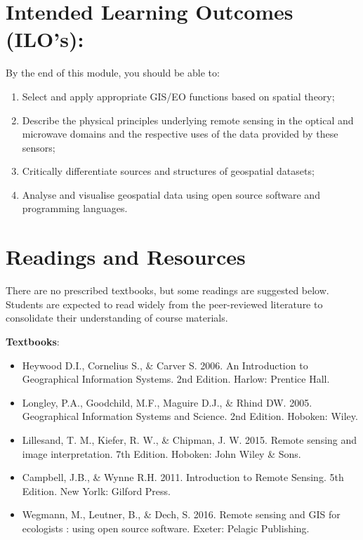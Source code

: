 \documentclass[
]{book}
\providecommand{\tightlist}{%
  \setlength{\itemsep}{0pt}\setlength{\parskip}{0pt}}
\begin{document}
\hypertarget{intended-learning-outcomes-ilos}{%
\section{Intended Learning Outcomes (ILO's):}\label{intended-learning-outcomes-ilos}}

By the end of this module, you should be able to:

\begin{enumerate}
\def\labelenumi{\arabic{enumi}.}
\tightlist
\item
  Select and apply appropriate GIS/EO functions based on spatial theory;
\item
  Describe the physical principles underlying remote sensing in the optical and microwave domains and the respective uses of the data provided by these sensors;
\item
  Critically differentiate sources and structures of geospatial datasets;
\item
  Analyse and visualise geospatial data using open source software and programming languages.
\end{enumerate}

\hypertarget{readings-and-resources}{%
\section{Readings and Resources}\label{readings-and-resources}}

There are no prescribed textbooks, but some readings are suggested below. Students are expected to read widely from the peer-reviewed literature to consolidate their understanding of course materials.

\textbf{Textbooks}:

\begin{itemize}
\item
  Heywood D.I., Cornelius S., \& Carver S. 2006. An Introduction to Geographical Information Systems. 2nd Edition. Harlow: Prentice Hall.
\item
  Longley, P.A., Goodchild, M.F., Maguire D.J., \& Rhind DW. 2005. Geographical Information Systems and Science. 2nd Edition. Hoboken: Wiley.
\item
  Lillesand, T. M., Kiefer, R. W., \& Chipman, J. W. 2015. Remote sensing and image interpretation. 7th Edition. Hoboken: John Wiley \& Sons.
\item
  Campbell, J.B., \& Wynne R.H. 2011. Introduction to Remote Sensing. 5th Edition. New Yorlk: Gilford Press.
\item
  Wegmann, M., Leutner, B., \& Dech, S. 2016. Remote sensing and GIS for ecologists : using open source software. Exeter: Pelagic Publishing.
\end{itemize}
\end{document}
